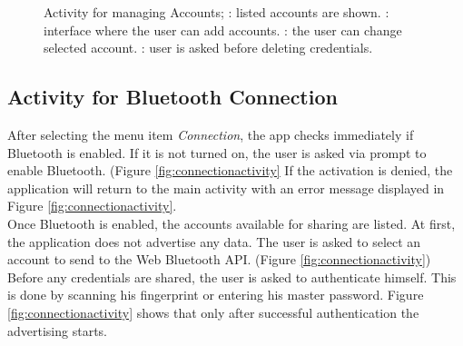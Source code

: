 \begin{figure}[H]
\qquad
{}
\caption[Activity for managing Accounts]{Activity for managing Accounts; \protect{}: listed accounts are shown. \protect{}: interface where the user can add accounts. \protect{}: the user can change selected account. \protect{}: user is asked before deleting credentials.}
\label{fig:accountactivity}
\end{figure}


\subsection{Activity for Bluetooth Connection}
After selecting the menu item \textit{Connection}, the app checks immediately if Bluetooth is enabled. If it is not turned on, the user is asked via prompt to enable Bluetooth. (Figure \ref{fig:connectionactivity}\protect{}
If the activation is denied, the application will return to the main activity with an error message displayed in Figure \ref{fig:connectionactivity}\protect{}. \\
Once Bluetooth is enabled, the accounts available for sharing are listed. At first, the application does not advertise any data. The user is asked to select an account to send to the Web Bluetooth API. (Figure \ref{fig:connectionactivity}\protect{}) Before any credentials are shared, the user is asked to authenticate himself. This is done by scanning his fingerprint or entering his master password. Figure \ref{fig:connectionactivity}\protect{} shows that only after successful authentication the advertising starts.

